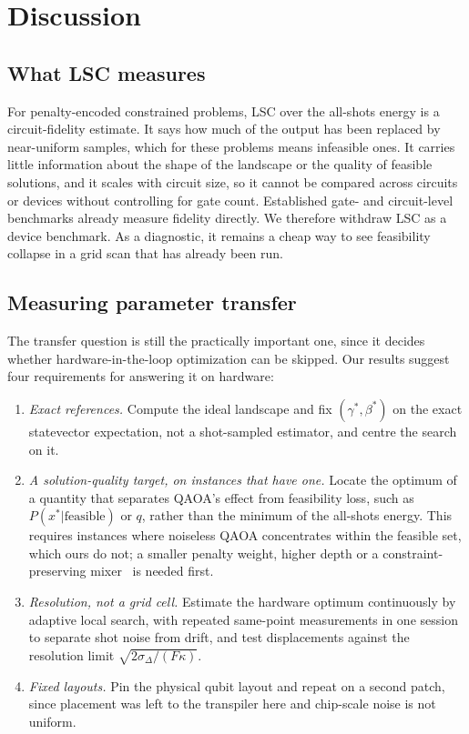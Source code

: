 \documentclass[conference]{IEEEtran}
\begin{document}
\section{Discussion}
\label{sec:discussion}

\subsection{What LSC measures}

For penalty-encoded constrained problems, LSC over the all-shots
energy is a circuit-fidelity estimate. It says how much of the output
has been replaced by near-uniform samples, which for these problems
means infeasible ones. It carries little information about the shape of
the landscape or the quality of feasible solutions, and it scales with
circuit size, so it cannot be compared across circuits or devices
without controlling for gate count. Established gate- and circuit-level
benchmarks already measure fidelity directly. We therefore withdraw LSC
as a device benchmark. As a diagnostic, it remains a cheap way to see
feasibility collapse in a grid scan that has already been run.

\subsection{Measuring parameter transfer}
\label{sec:protocol}

The transfer question is still the practically important one, since it
decides whether hardware-in-the-loop optimization can be skipped. Our
results suggest four requirements for answering it on hardware:

\begin{enumerate}
  \item \emph{Exact references.} Compute the ideal landscape and fix
        $(\gamma^*,\beta^*)$ on the exact statevector expectation, not a
        shot-sampled estimator, and centre the search on it.
  \item \emph{A solution-quality target, on instances that have one.}
        Locate the optimum of a quantity that separates QAOA's effect
        from feasibility loss, such as $P(x^*|\mathrm{feasible})$ or
        $q$, rather than the minimum of the all-shots energy. This
        requires instances where noiseless QAOA concentrates within the
        feasible set, which ours do not; a smaller penalty weight,
        higher depth or a constraint-preserving
        mixer~\cite{bartschi2020grover} is needed first.
  \item \emph{Resolution, not a grid cell.} Estimate the hardware
        optimum continuously by adaptive local search, with repeated
        same-point measurements in one session to separate shot noise
        from drift, and test displacements against the resolution
        limit $\sqrt{2\sigma_\Delta/(F\kappa)}$.
  \item \emph{Fixed layouts.} Pin the physical qubit layout and repeat
        on a second patch, since placement was left to the transpiler
        here and chip-scale noise is not uniform.
\end{enumerate}
\end{document}
